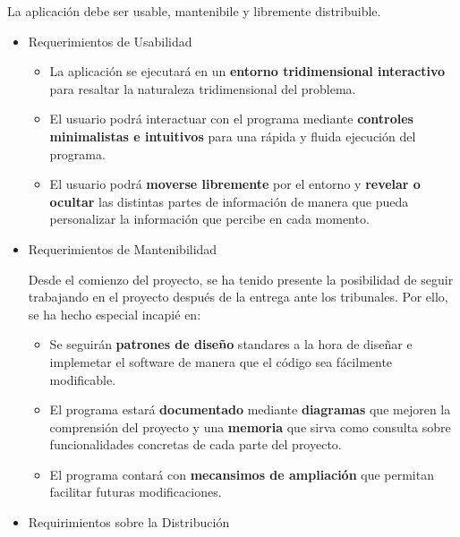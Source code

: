 \documentclass[12pt,a4paper,openright,oneside]{article}
\numberwithin{equation}{section}
\theoremstyle{definition}
\begin{document}
La aplicación debe ser usable, mantenibile y libremente distribuible.
\begin{itemize}
\item Requerimientos de Usabilidad

\begin{itemize}

\item La aplicación se ejecutará en un \textbf{entorno tridimensional interactivo} para resaltar la naturaleza tridimensional del problema.

\item El usuario podrá interactuar con el programa mediante \textbf{controles minimalistas e intuitivos} para una rápida y fluida ejecución del programa.

\item El usuario podrá \textbf{moverse libremente} por el entorno y \textbf{revelar o ocultar} las distintas partes de información de manera que pueda personalizar la información que percibe en cada momento.

\end{itemize}

\item Requerimientos de Mantenibilidad

Desde el comienzo del proyecto, se ha tenido presente la posibilidad de seguir trabajando en el proyecto después de la entrega ante los tribunales. Por ello, se ha hecho especial incapié en:

\begin{itemize}

\item Se seguirán \textbf{patrones de diseño} standares a la hora de diseñar e implemetar el software de manera que el código sea fácilmente modificable.

\item El programa estará \textbf{documentado} mediante \textbf{diagramas} que mejoren la comprensión del proyecto y una \textbf{memoria} que sirva como consulta sobre funcionalidades concretas de cada parte del proyecto.

\item El programa contará con \textbf{mecansimos de ampliación} que permitan facilitar futuras modificaciones.

\end{itemize}

\item Requirimientos sobre la Distribución

\begin{itemize}


\end{itemize}
\end{itemize}
\end{document}
